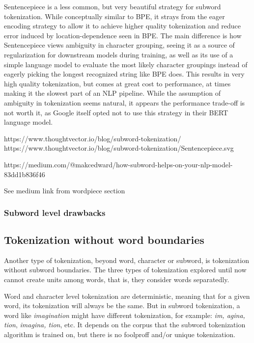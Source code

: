 Sentencepiece is a less common, but very beautiful strategy for subword tokenization. While conceptually similar to BPE, it strays from the eager encoding strategy to allow it to achieve higher quality tokenization and reduce error induced by location-dependence seen in BPE. The main difference is how Sentencepiece views ambiguity in character grouping, seeing it as a source of regularization for downstream models during training, as well as its use of a simple language model to evaluate the most likely character groupings instead of eagerly picking the longest recognized string like BPE does. This results in very high quality tokenization, but comes at great cost to performance, at times making it the slowest part of an NLP pipeline. While the assumption of ambiguity in tokenization seems natural, it appears the performance trade-off is not worth it, as Google itself opted not to use this strategy in their BERT language model.

https://www.thoughtvector.io/blog/subword-tokenization/
https://www.thoughtvector.io/blog/subword-tokenization/Sentencepiece.svg

https://medium.com/@makcedward/how-subword-helps-on-your-nlp-model-83dd1b836f46

See medium link from wordpiece section


\subsubsection{Subword level drawbacks}

\subsection{Tokenization without word boundaries}\label{subsec:wordtokwowb}

Another type of tokenization, beyond word, character or subword, is tokenization without subword boundaries. The three types of tokenization explored until now cannot create units among words, that is, they consider words separatedly.

Word and character level tokenization are deterministic, meaning that for a given word, its tokenization will always be the same. But in subword tokenization, a word like \emph{imagination} might have different tokenization, for example: \emph{im, agina, tion}, \emph{imagina, tion}, etc. It depends on the corpus that the subword tokenization algorithm is trained on, but there is no foolproff and/or unique tokenization.

